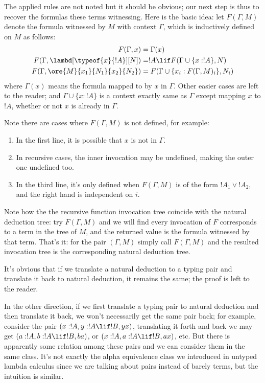 \documentclass[../../../include/open-logic-section]{subfiles}
\begin{document}
The applied rules  are not noted but it should be obvious; our next
step is thus to recover the formulas these terms witnessing. Here is
the basic idea: let $F(\Gamma,M)$ denote the formula witnessed by
$M$ with context $\Gamma$, which is inductively defined on $M$ as follows:
\begin{align*}
  F(\Gamma, x) &= \Gamma(x) \\
  F(\Gamma, \lambd[\typeof{x}{!A}][N]) &= !A \lif F(\Gamma \cup
  \{x:!A\}, N) \\
  F(\Gamma, \ore{M}{x_1}{N_1}{x_2}{N_2}) &= F(\Gamma \cup
  \{x_i:F(\Gamma, M)_i\}, N_i) 
\end{align*}
where $\Gamma(x)$ means the formula mapped to by $x$ in $\Gamma$.
Other easier cases are left to the reader; and $\Gamma \cup \{x:!A\}$
is a context exactly same as $\Gamma$ except mapping $x$ to $!A$,
whether or not $x$ is already in $\Gamma$.

Note there are cases where $F(\Gamma, M)$ is not defined, for example:
\begin{enumerate}
\item In the first line, it is possible that $x$ is not in $\Gamma$.
\item In recursive cases, the inner invocation may be undefined, making
  the outer one undefined too.
\item In the third line, it's only defined when $F(\Gamma, M)$ is of
  the form $!A_1 \lor !A_2$, and the right hand is independent on $i$.
\end{enumerate}

Note how the the recursive function invocation tree coincide with the natural
deduction tree: try $F(\Gamma, M)$ and we will find every invocation
of $F$ corresponds to a term in the tree of $M$, and the returned
value is the formula witnessed by that term. That's it: for the pair
$(\Gamma, M)$ simply call $F(\Gamma, M)$ and the resulted invocation
tree is the corresponding natural deduction tree.

It's obvious that if we translate a natural deduction to a
typing pair and translate it back to natural deduction, it remains the
same; the proof is left to the reader.

In the other direction, if we first translate a typing pair to natural
deduction and then translate it back, we won't necessarily get the
same pair back; for example, consider the pair $(x:!A, y:!A \lif !B, y x)$,
translating it forth and back we may get $(a:!A, b:!A \lif !B, b a)$,
or $(x:!A, a:!A \lif !B, a x)$, etc. But there is apparently some
relation among these pairs and we can consider them in the same class.
It's not exactly the alpha equivalence class we introduced in untyped
lambda calculus since we are talking about pairs instead of
barely terms, but the intuition is similar.
\end{document}
